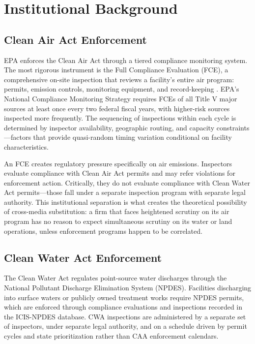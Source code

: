 \documentclass[12pt]{article}
\begin{document}
\section{Institutional Background}
\label{sec:background}

\subsection{Clean Air Act Enforcement}

EPA enforces the Clean Air Act through a tiered compliance monitoring system. The most rigorous instrument is the Full Compliance Evaluation (FCE), a comprehensive on-site inspection that reviews a facility's entire air program: permits, emission controls, monitoring equipment, and record-keeping \citep{epa2014cms}. EPA's National Compliance Monitoring Strategy requires FCEs of all Title V major sources at least once every two federal fiscal years, with higher-risk sources inspected more frequently. The sequencing of inspections within each cycle is determined by inspector availability, geographic routing, and capacity constraints---factors that provide quasi-random timing variation conditional on facility characteristics.

An FCE creates regulatory pressure specifically on air emissions. Inspectors evaluate compliance with Clean Air Act permits and may refer violations for enforcement action. Critically, they do not evaluate compliance with Clean Water Act permits---those fall under a separate inspection program with separate legal authority. This institutional separation is what creates the theoretical possibility of cross-media substitution: a firm that faces heightened scrutiny on its air program has no reason to expect simultaneous scrutiny on its water or land operations, unless enforcement programs happen to be correlated.

\subsection{Clean Water Act Enforcement}

The Clean Water Act regulates point-source water discharges through the National Pollutant Discharge Elimination System (NPDES). Facilities discharging into surface waters or publicly owned treatment works require NPDES permits, which are enforced through compliance evaluations and inspections recorded in the ICIS-NPDES database. CWA inspections are administered by a separate set of inspectors, under separate legal authority, and on a schedule driven by permit cycles and state prioritization rather than CAA enforcement calendars.
\end{document}
